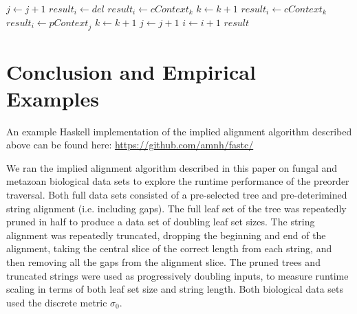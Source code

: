\documentclass[11pt]{article}
\begin{document}
\begin{algorithm}
\begin{algorithmic}[1]
                \EndCase
              \EndSwitch
              \State $\textit{j} \gets \textit{j} + 1$
            \EndCase
                  \State $\textit{result}_i \gets \textit{del}$
                \EndCase
                  \State $\textit{result}_i \gets \textit{cContext}_k$
                  \State $\textit{k} \gets \textit{k} + 1$
                \EndCase
                    \State $\textit{result}_i \gets \textit{cContext}_k$
                  \Else
                    \State $\textit{result}_i \gets \textit{pContext}_j$
                  \EndIf
                    \State $\textit{k} \gets \textit{k} + 1$
                \EndCase
              \EndSwitch
              \State $\textit{j} \gets \textit{j} + 1$
            \EndCase
          \EndSwitch
        \EndIf
        \State $\textit{i} \gets \textit{i} + 1$
      \EndFor
      \Return $\textit{result}$
    \EndFunction
  \end{algorithmic}
\end{algorithm}

\restoregeometry

\section{Conclusion and Empirical Examples}

An example Haskell implementation of the implied alignment algorithm described above can be found here: \url{https://github.com/amnh/fastc/}

We ran the implied alignment algorithm described in this paper on fungal and metazoan biological data sets to explore the runtime performance of the preorder traversal.
Both full data sets consisted of a pre-selected tree and pre-deterimined string alignment (i.e. including gaps).
The full leaf set of the tree was repeatedly pruned in half to produce a data set of doubling leaf set sizes.
The string alignment was repeatedly truncated, dropping the beginning and end of the alignment, taking the central slice of the correct length from each string, and then removing all the gaps from the alignment slice.
The pruned trees and truncated strings were used as progressively doubling inputs, to measure runtime scaling in terms of both leaf set size and string length.
Both biological data sets used the discrete metric $\sigma_0$.
\end{document}
